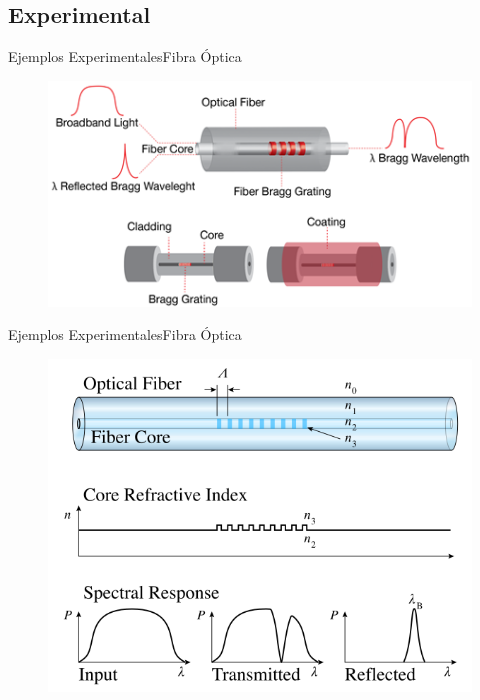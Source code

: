 \documentclass[]{beamer}
\begin{document}
\subsection{Experimental}
\begin{frame}{Ejemplos Experimentales}{Fibra Óptica}
  \begin{figure}
    \includegraphics[height=0.7\textheight]{Docs/exp1}
    \caption{}
    \label{}
  \end{figure}

\end{frame}

\begin{frame}{Ejemplos Experimentales}{Fibra Óptica}
  \begin{figure}
    \includegraphics[height=0.7\textheight]{Docs/exp2}
    \caption{}
    \label{}
  \end{figure}

\end{frame}
\end{document}
